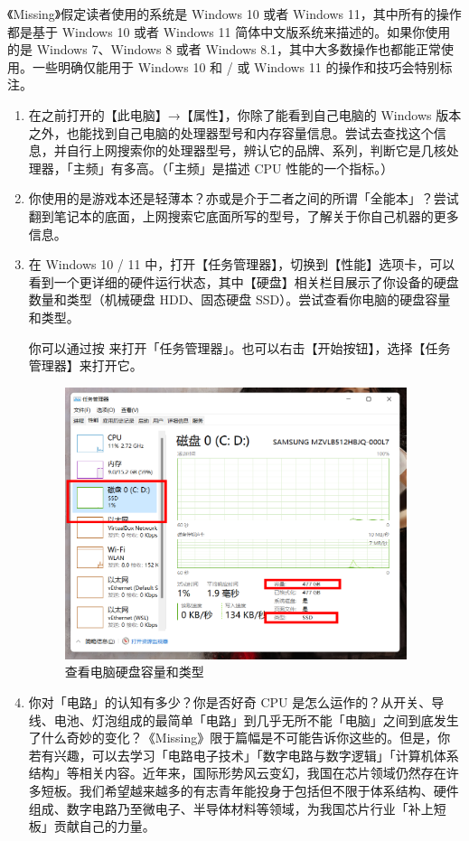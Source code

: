 《Missing》假定读者使用的系统是 Windows 10 或者 Windows 11，其中所有的操作都是基于 Windows 10 或者 Windows 11 简体中文版系统来描述的。如果你使用的是 Windows 7、Windows 8 或者 Windows 8.1，其中大多数操作也都能正常使用。一些明确仅能用于 Windows 10 和 / 或 Windows 11 的操作和技巧会特别标注。

\practice

\begin{enumerate}
  \item 在之前打开的【此电脑】→【属性】，你除了能看到自己电脑的 Windows 版本之外，也能找到自己电脑的处理器型号和内存容量信息。尝试去查找这个信息，并自行上网搜索你的处理器型号，辨认它的品牌、系列，判断它是几核处理器，「主频」有多高。（「主频」是描述 CPU 性能的一个指标。）
  \item 你使用的是游戏本还是轻薄本？亦或是介于二者之间的所谓「全能本」？尝试翻到笔记本的底面，上网搜索它底面所写的型号，了解关于你自己机器的更多信息。
  \item 在 Windows 10 / 11 中，打开【任务管理器】，切换到【性能】选项卡，可以看到一个更详细的硬件运行状态，其中【硬盘】相关栏目展示了你设备的硬盘数量和类型（机械硬盘 HDD、固态硬盘 SSD）。尝试查看你电脑的硬盘容量和类型。
  
  你可以通过按  来打开「任务管理器」。也可以右击【开始按钮】，选择【任务管理器】来打开它。
  \begin{figure}[H]
    \centering
    \includegraphics[width=10cm]{assets/Check_disk_status.png}
    \caption{查看电脑硬盘容量和类型}
    \label{check-disk}
  \end{figure}
  \item 你对「电路」的认知有多少？你是否好奇 CPU 是怎么运作的？从开关、导线、电池、灯泡组成的最简单「电路」到几乎无所不能「电脑」之间到底发生了什么奇妙的变化？《Missing》限于篇幅是不可能告诉你这些的。但是，你若有兴趣，可以去学习「电路电子技术」「数字电路与数字逻辑」「计算机体系结构」等相关内容。近年来，国际形势风云变幻，我国在芯片领域仍然存在许多短板。我们希望越来越多的有志青年能投身于包括但不限于体系结构、硬件组成、数字电路乃至微电子、半导体材料等领域，为我国芯片行业「补上短板」贡献自己的力量。
\end{enumerate}

